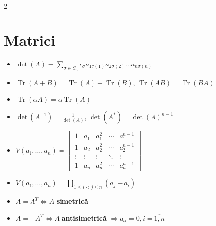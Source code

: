 \documentclass[10pt]{extarticle}
\begin{document}
\small %
\begin{multicols*}{2}

\section*{Matrici}
\begin{itemize}[leftmargin=*]
  \item $\det(A) = \sum_{\sigma \in S_n} \epsilon_{\sigma}a_{1\sigma(1)}a_{2\sigma(2)}...a_{n\sigma(n )}$
  \item $\operatorname{Tr}(A + B) = \operatorname{Tr}(A) + \operatorname{Tr}(B)$, $\operatorname{Tr}(AB) = \operatorname{Tr}(BA)$
  \item $\operatorname{Tr}(\alpha A) = \alpha\operatorname{Tr}(A)$
  \item $\operatorname{det}(A^{-1}) = \frac{1}{\operatorname{det}(A)}$, $\operatorname{det}(A^*) = \operatorname{det}(A)^{n-1}$
  \item $
  V(a_1, \dots, a_n) = 
  \begin{vmatrix}
  1 & a_1 & a_1^2 & \cdots & a_1^{n-1} \\
  1 & a_2 & a_2^2 & \cdots & a_2^{n-1} \\
  \vdots & \vdots & \vdots & \ddots & \vdots \\
  1 & a_n & a_n^2 & \cdots & a_n^{n-1}
  \end{vmatrix}
  $
  \item $
  V(a_1, \dots, a_n) = \prod_{1 \le i < j \le n}(a_j - a_i)
  $
  \item $A = A^T \Leftrightarrow A$ \textbf{simetrică}
  \item $A = -A^T \Leftrightarrow A$ \textbf{antisimetrică} $\Rightarrow a_{ii} = 0, i = \overline{1, n}$
\end{itemize}


\end{multicols*}
\end{document}
